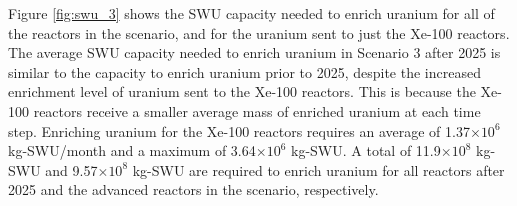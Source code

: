 Figure \ref{fig:swu_3} shows the \gls{SWU} capacity needed to enrich 
uranium for all of the reactors in the scenario, and for the uranium sent 
to just the Xe-100 reactors. The average \gls{SWU} capacity needed to enrich uranium 
in Scenario 3 after 2025 is similar to the capacity to enrich uranium prior to 2025, 
despite the increased enrichment level of uranium 
sent to the Xe-100 reactors. This is because the Xe-100 reactors receive 
a smaller average mass of enriched uranium at each time step. Enriching uranium 
for the Xe-100 reactors requires an average of 
1.37$\times 10^6$ kg-\gls{SWU}/month and a maximum of 3.64$\times 10^6$
kg-\gls{SWU}. A total of 11.9$\times 10^8$ kg-SWU and 9.57$\times 10^8$
kg-SWU are required 
to enrich uranium for all reactors after 2025 and the advanced reactors in the 
scenario, respectively. 

